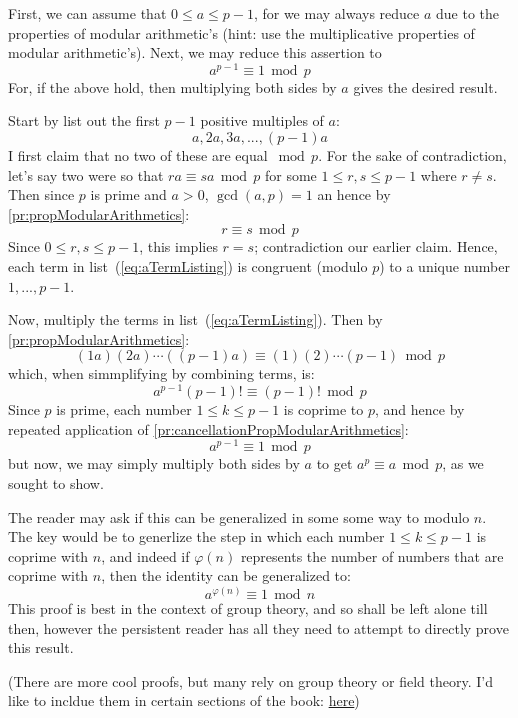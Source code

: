 \documentclass{book}
\let\temp\phi
\let\phi\varphi
\let\varphi\temp
\renewcommand{\mod}{\,\operatorname{mod}\,}
\begin{document}
\begin{Proof}
	First, we can assume that $0 \le a \le p-1$, for we may always reduce $a$ due to the properties of modular
	arithmetic's (hint: use the multiplicative properties of modular arithmetic's). Next, we may reduce this
	assertion to
	\[
		a^{p-1}\equiv 1 \mod p
	\]
	For, if the above hold, then multiplying both sides by $a$ gives the desired result.

	Start by list out the first $p-1$ positive multiples of $a$:
	\begin{equation}\label{eq:aTermListing}
				a, 2a, 3a, ..., (p-1)a
	\end{equation}
	I first claim that no two of these are equal $\mod p$. For the sake of contradiction, let's say two were
	so that $ra \equiv sa\mod p$ for some $1 \le r,s \le p-1$ where $r\ne s$. Then since $p$ is prime and $a
	> 0$, $\gcd(a,p) = 1$ an hence by \cref{pr:propModularArithmetics}:
	\[
		r\equiv s \mod p
	\]
	Since $0 \le r,s \le p-1$, this implies $r = s$; contradiction our earlier claim. Hence, each term in
	list~(\ref{eq:aTermListing}) is congruent (modulo $p$) to a unique number $1, ..., p-1$.

	Now, multiply the terms in list~(\ref{eq:aTermListing}). Then by
	\cref{pr:propModularArithmetics}:
	\[
		(1a)(2a)\cdots((p-1)a) \equiv (1)(2)\cdots(p-1)\mod p
	\]
	which, when simmplifying by combining terms, is:
	\[
		a^{p-1}(p-1)! \equiv (p-1)!\mod p
	\]
	Since $p$ is prime, each number $1 \le k \le p-1$ is coprime to $p$, and hence by
	repeated application of \cref{pr:cancellationPropModularArithmetics}:
	\[
		a^{p-1} \equiv 1 \mod p
	\]
	but now, we may simply multiply both sides by $a$ to get $a^{p} \equiv a \mod p$, as we sought to show.
\end{Proof}

The reader may ask if this can be generalized in some some way to modulo $n$. The key would be to generlize
the step in which each number $1 \le k \le p-1$ is coprime with $n$, and indeed if $\phi(n)$ represents the
number of numbers that are coprime with $n$, then the identity can be generalized to:
\[
	a^{\phi(n)} \equiv 1 \mod n
\]
This proof is best in the context of group theory, and so shall be left alone till then, however the
persistent reader has all they need to attempt to directly prove this result.

(There are more cool proofs, but many rely on group theory or field theory. I'd like to incldue them in
certain sections of the book: \href{https://en.wikipedia.org/wiki/Modular_arithmetic}{here})
\end{document}
